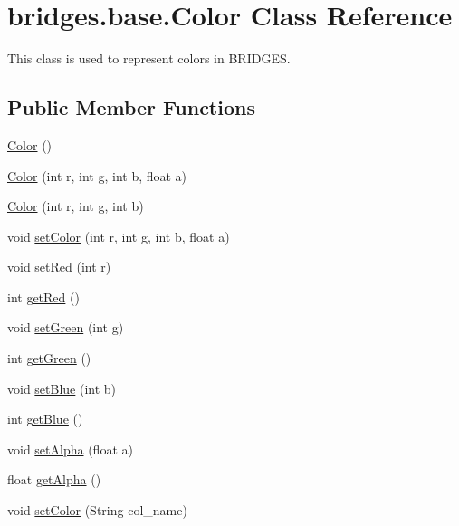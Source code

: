 \hypertarget{classbridges_1_1base_1_1_color}{}\section{bridges.\+base.\+Color Class Reference}
\label{classbridges_1_1base_1_1_color}


This class is used to represent colors in B\+R\+I\+D\+G\+E\+S.  


\subsection*{Public Member Functions}
\begin{DoxyCompactItemize}
\item 
\hyperlink{classbridges_1_1base_1_1_color_ab6d71ac2ee1430fb2db2fbe34e692de8}{Color} ()
\item 
\hyperlink{classbridges_1_1base_1_1_color_a15f56590ca3c9cc161c7bfa47060ad21}{Color} (int r, int g, int b, float a)
\item 
\hyperlink{classbridges_1_1base_1_1_color_a5fab564fa4eec8bece64f847ebd42948}{Color} (int r, int g, int b)
\item 
void \hyperlink{classbridges_1_1base_1_1_color_a5559b1c7eb4c3901526b1012029b528f}{set\+Color} (int r, int g, int b, float a)
\item 
void \hyperlink{classbridges_1_1base_1_1_color_a1d78967703924b709e76def5b2b3ee9a}{set\+Red} (int r)
\item 
int \hyperlink{classbridges_1_1base_1_1_color_af1a30dc925b35d6bfe609f8838651025}{get\+Red} ()
\item 
void \hyperlink{classbridges_1_1base_1_1_color_a415a28133ade4e216c02ecdfc8a32a1d}{set\+Green} (int g)
\item 
int \hyperlink{classbridges_1_1base_1_1_color_a8f3fdd23cf785704faa2e3701e25978f}{get\+Green} ()
\item 
void \hyperlink{classbridges_1_1base_1_1_color_a0e04156b1573cf8002c4d9cb69825657}{set\+Blue} (int b)
\item 
int \hyperlink{classbridges_1_1base_1_1_color_ad4b82e1eb9ff59857d2868edd8d4ce65}{get\+Blue} ()
\item 
void \hyperlink{classbridges_1_1base_1_1_color_afab07ce64efa1fa5797795670b0effb6}{set\+Alpha} (float a)
\item 
float \hyperlink{classbridges_1_1base_1_1_color_a7c4247e31ecd8fcc61ef208d5deefe68}{get\+Alpha} ()
\item 
void \hyperlink{classbridges_1_1base_1_1_color_a54dcd31227bde0f5d0a4f5d3b5a24ed2}{set\+Color} (String col\+\_\+name)
\end{DoxyCompactItemize}


